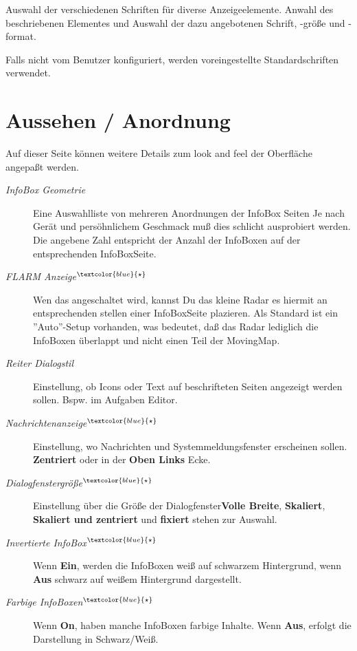 Auswahl der verschiedenen Schriften für diverse Anzeigeelemente. Anwahl des beschriebenen
Elementes und Auswahl der dazu angebotenen Schrift, -größe und -format.


Falls nicht vom Benutzer konfiguriert, werden voreingestellte Standardschriften verwendet.


\vspace{5em}
\section{Aussehen / Anordnung}\label{sec:interface-appearance}

Auf dieser Seite können weitere Details zum look and feel der Oberfläche
angepaßt werden.


\begin{description}
\item[\textit{InfoBox Geometrie}]  Eine Auswahlliste von mehreren Anordnungen der InfoBox Seiten Je nach Gerät und persöhnlichem
Geschmack muß dies schlicht ausprobiert werden. Die angebene Zahl entspricht der Anzahl der InfoBoxen auf der entsprechenden InfoBoxSeite.
\item[\textit{FLARM Anzeige$^{\textcolor{blue}{\star}}$}]  \label{conf:flarmradar-place}
Wen das \fl angeschaltet wird, kannst Du das kleine \fl Radar es hiermit an entsprechenden stellen einer InfoBoxSeite plazieren.
Als Standard ist ein ''Auto''-Setup vorhanden, was bedeutet, daß das Radar lediglich die InfoBoxen
überlappt und nicht einen Teil der MovingMap.
\item[\textit{Reiter Dialogstil}] Einstellung, ob Icons oder Text auf beschrifteten Seiten angezeigt werden sollen.
Bspw. im Aufgaben Editor.
\item[\textit{Nachrichtenanzeige$^{\textcolor{blue}{\star}}$}]  Einstellung, wo Nachrichten und Systemmeldungsfenster
erscheinen sollen.   {\bf Zentriert} oder in der {\bf Oben Links} Ecke.
\item[\textit{Dialogfenstergröße$^{\textcolor{blue}{\star}}$}]  Einstellung über die Größe der Dialogfenster{\bf Volle Breite},  {\bf Skaliert},  {\bf Skaliert und zentriert} und {\bf fixiert} stehen zur Auswahl.
\item[\textit{Invertierte InfoBox$^{\textcolor{blue}{\star}}$}]  Wenn {\bf Ein}, werden die InfoBoxen weiß auf schwarzem Hintergrund, wenn {\bf Aus} schwarz auf weißem Hintergrund dargestellt.
\item[\textit{Farbige InfoBoxen$^{\textcolor{blue}{\star}}$}]  Wenn {\bf On}, haben manche InfoBoxen farbige Inhalte. Wenn {\bf Aus}, erfolgt die Darstellung in Schwarz/Weiß.

\end{description}
